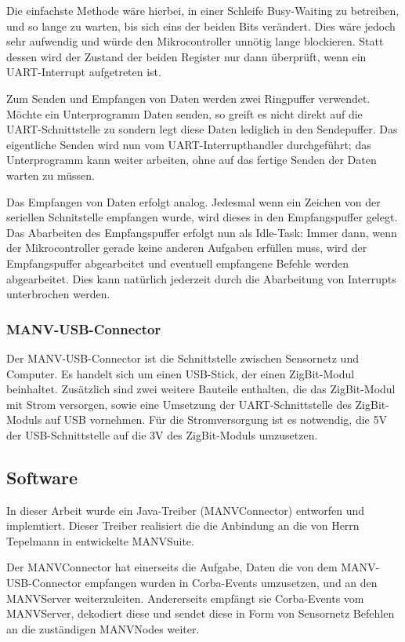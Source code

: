 Die einfachste Methode wäre hierbei, in einer Schleife Busy-Waiting zu betreiben, und so lange zu warten,
bis sich eins der beiden Bits verändert. Dies wäre jedoch sehr aufwendig und würde den Mikrocontroller 
unnötig lange blockieren. Statt dessen wird der Zustand der beiden Register nur dann überprüft, wenn ein 
UART-Interrupt aufgetreten ist.

Zum Senden und Empfangen von Daten werden zwei Ringpuffer verwendet. Möchte ein Unterprogramm Daten senden,
so greift es nicht direkt auf die UART-Schnittstelle zu sondern legt diese Daten lediglich in den Sendepuffer.
Das eigentliche Senden wird nun vom UART-Interrupthandler durchgeführt; das Unterprogramm kann weiter arbeiten,
ohne auf das fertige Senden der Daten warten zu müssen.

Das Empfangen von Daten erfolgt analog. Jedesmal wenn ein Zeichen von der seriellen Schnitstelle empfangen
wurde, wird dieses in den Empfangspuffer gelegt. Das Abarbeiten des Empfangspuffer erfolgt nun als Idle-Task:
Immer dann, wenn der Mikrocontroller gerade keine anderen Aufgaben erfüllen muss, wird der Empfangspuffer
abgearbeitet und eventuell empfangene Befehle werden abgearbeitet. Dies kann natürlich jederzeit durch 
die Abarbeitung von Interrupts unterbrochen werden.

\subsubsection{MANV-USB-Connector}
{}
Der MANV-USB-Connector ist die Schnittstelle zwischen Sensornetz und Computer. Es handelt sich um einen USB-Stick, der einen
ZigBit-Modul beinhaltet. Zusätzlich sind zwei weitere Bauteile enthalten, die das ZigBit-Modul mit Strom versorgen, sowie eine
Umsetzung der UART-Schnittstelle des ZigBit-Moduls auf USB vornehmen. Für die Stromversorgung ist es notwendig, die 5V der
USB-Schnittstelle auf die 3V des ZigBit-Moduls umzusetzen.

\subsection{Software}

In dieser Arbeit wurde ein Java-Treiber (MANVConnector) entworfen und implemtiert. Dieser Treiber realisiert die die Anbindung an
die von Herrn Tepelmann in \cite{Jan} entwickelte MANVSuite.

Der MANVConnector hat einerseits die Aufgabe, Daten die von dem MANV-USB-Connector empfangen wurden in Corba-Events 
umzusetzen, und an den MANVServer weiterzuleiten. Andererseits empfängt sie Corba-Events vom MANVServer, dekodiert
diese und sendet diese in Form von Sensornetz Befehlen an die zuständigen MANVNodes weiter.

